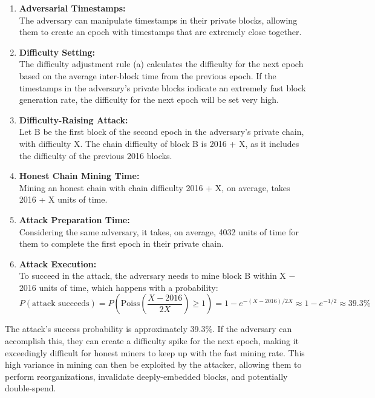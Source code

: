 \documentclass{report}
\begin{document}
\begin{enumerate}
	\item \textbf{Adversarial Timestamps:} \\The adversary can manipulate timestamps in their private blocks, allowing them to create an epoch with timestamps that are extremely close together.
	\item \textbf{Difficulty Setting:}\\The difficulty adjustment rule (a) calculates the difficulty for the next epoch based on the average inter-block time from the previous epoch. If the timestamps in the adversary's private blocks indicate an extremely fast block generation rate, the difficulty for the next epoch will be set very high.
	\item \textbf{Difficulty-Raising Attack:}\\Let B be the first block of the second epoch in the adversary's private chain, with difficulty X. The chain difficulty of block B is 2016 + X, as it includes the difficulty of the previous 2016 blocks.
	\item \textbf{Honest Chain Mining Time:}\\Mining an honest chain with chain difficulty 2016 + X, on average, takes 2016 + X units of time.
	\item \textbf{Attack Preparation Time:}\\Considering the same adversary, it takes, on average, 4032 units of time for them to complete the first epoch in their private chain.
	\item \textbf{Attack Execution:}\\To succeed in the attack, the adversary needs to mine block B within X − 2016 units of time, which happens with a probability:\begin{equation*}
		P(\text{attack succeeds}) = P(\text{Poiss}\left(\frac{X-2016}{2X}\right) \geq 1) = 1 - e^{-(X-2016)/2X} \approx 1 - e^{-1/2} \approx 39.3\%
	\end{equation*}
	
\end{enumerate}
The attack's success probability is approximately 39.3\%. If the adversary can accomplish this, they can create a difficulty spike for the next epoch, making it exceedingly difficult for honest miners to keep up with the fast mining rate. This high variance in mining can then be exploited by the attacker, allowing them to perform reorganizations, invalidate deeply-embedded blocks, and potentially double-spend.\\\\
\end{document}
